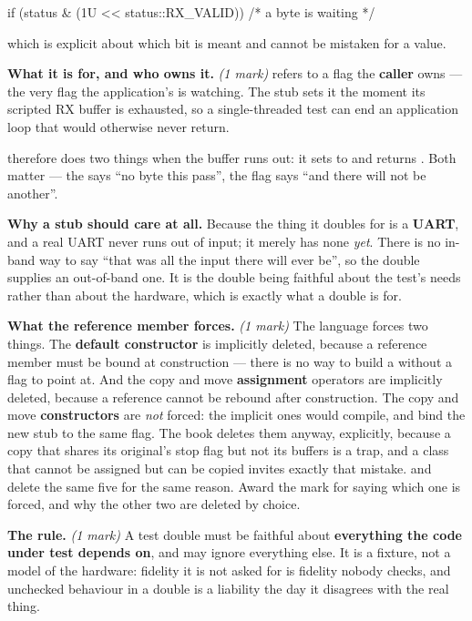 \begin{cppcode}
if (status & (1U << status::RX_VALID)) { /* a byte is waiting */ }
\end{cppcode}

\noindent which is explicit about which bit is meant and cannot be mistaken for a value.

\textbf{What it is for, and who owns it.} \textit{(1 mark)}  refers to a flag the
\textbf{caller} owns --- the very flag the application's  is watching.
The stub sets it  the moment its scripted RX buffer is exhausted, so a single-threaded
test can end an application loop that would otherwise never return.

 therefore does two things when the buffer runs out: it sets  to
 and returns . Both matter --- the  says ``no byte this pass'',
the flag says ``and there will not be another''.

\textbf{Why a stub should care at all.} Because the thing it doubles for is a \textbf{UART}, and a
real UART never runs out of input; it merely has none \emph{yet}. There is no in-band way to say
``that was all the input there will ever be'', so the double supplies an out-of-band one. It is the
double being faithful about the test's needs rather than about the hardware, which is exactly what a
double is for.

\textbf{What the reference member forces.} \textit{(1 mark)} The language forces two things. The
\textbf{default constructor} is implicitly deleted, because a reference member must be bound at
construction --- there is no way to build a  without a flag to point at. And the copy and
move \textbf{assignment} operators are implicitly deleted, because a reference cannot be rebound
after construction. The copy and move \textbf{constructors} are \emph{not} forced: the implicit ones
would compile, and bind the new stub to the same flag. The book deletes them anyway, explicitly,
because a copy that shares its original's stop flag but not its buffers is a trap, and a class that
cannot be assigned but can be copied invites exactly that mistake.  and 
delete the same five for the same reason. Award the mark for saying which one is forced, and why the
other two are deleted by choice.

\textbf{The rule.} \textit{(1 mark)} A test double must be faithful about \textbf{everything the
code under test depends on}, and may ignore everything else. It is a fixture, not a model of the
hardware: fidelity it is not asked for is fidelity nobody checks, and unchecked behaviour in a double
is a liability the day it disagrees with the real thing.

